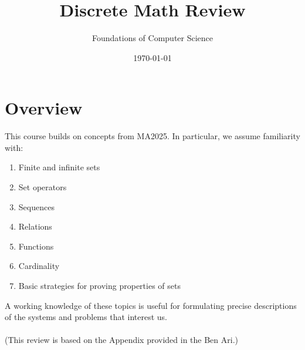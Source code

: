 \documentclass[style=sailor,size=12pt]{powerdot}
\title{Discrete Math Review}
\author{Foundations of Computer Science}
\date{\today}
\begin{document}
\maketitle
\section[slide=false]{Overview}
\begin{slide}[bm=,toc=]{This course builds on concepts from MA2025.}
In particular, we assume familiarity with:
\begin{enumerate}
\item Finite and infinite sets
\item Set operators
\item Sequences
\item Relations
\item Functions
\item Cardinality
\item Basic strategies for proving properties of sets
\end{enumerate} 
A working knowledge of these topics is useful for formulating precise descriptions
of the systems and problems that interest us.
\\~\\
(This review is based on the Appendix provided in the Ben Ari.)
\end{slide}
\end{document}

